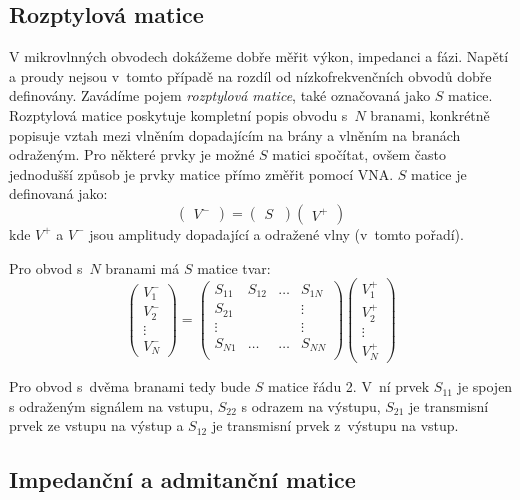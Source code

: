 \documentclass{protokol}
\begin{document}
\subsection{Rozptylová matice}

V mikrovlnných obvodech dokážeme dobře měřit výkon, impedanci a fázi. 
Napětí a proudy nejsou v~tomto případě na rozdíl od nízkofrekvenčních obvodů
dobře definovány.
Zavádíme pojem \emph{rozptylová matice}, také označovaná jako $S$ matice.
Rozptylová matice poskytuje kompletní popis obvodu s~$N$ branami,
konkrétně popisuje vztah mezi vlněním dopadajícím na brány
a vlněním na branách odraženým.
Pro některé prvky je možné $S$ matici spočítat,
ovšem často jednodušší způsob je prvky matice přímo změřit pomocí VNA.
$S$ matice je definovaná jako:
\[
\begin{pmatrix}
	V^-
\end{pmatrix}
=
\begin{pmatrix}
	S~\end{pmatrix}
%
\begin{pmatrix}
	V^+
\end{pmatrix}
\]
kde $V^+$ a $V^-$ jsou amplitudy dopadající a odražené vlny
(v~tomto pořadí).

Pro obvod s~$N$ branami má $S$ matice tvar:
\[
\begin{pmatrix}
	V_1^-     \\
	V_2^-		\\
	\vdots	\\
	V_N^-
\end{pmatrix}
=
\begin{pmatrix}
	S_{11} & S_{12} & \dots & S_{1N}   \\
	S_{21} &		& 		& \vdots	\\
	\vdots &		& 		& \vdots	\\
	S_{N1} & \dots	& \dots & S_{NN} 	\\
\end{pmatrix}
%
\begin{pmatrix}
	V_1^+     \\
	V_2^+		\\
	\vdots	\\
	V_N^+
\end{pmatrix}
\]

Pro obvod s~dvěma branami tedy bude $S$ matice řádu 2.
V~ní prvek $S_{11}$ je spojen s odraženým signálem na vstupu,
$S_{22}$ s odrazem na výstupu, $S_{21}$ je transmisní prvek ze vstupu na výstup
a $S_{12}$ je transmisní prvek z~výstupu na vstup.

\subsection{Impedanční a admitanční matice}
\end{document}
